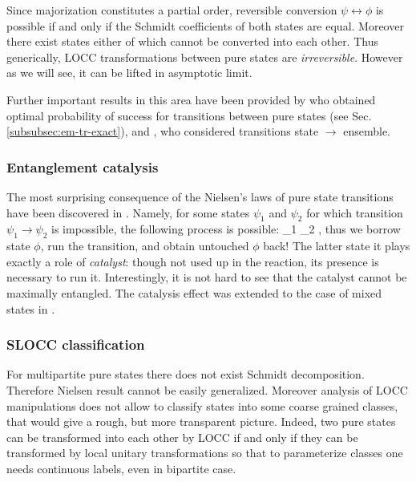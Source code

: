 \documentclass[rmp,12pt,preprint]{revtex4-2}
\begin{document}
Since majorization constitutes a partial order, reversible conversion
$\psi\leftrightarrow\phi$ is possible if and only if the Schmidt
coefficients of both states are equal. Moreover there exist states
either of which cannot be converted into each other. Thus generically,
LOCC transformations between pure states are {\it
  irreversible}. However as we will see, it can be lifted in
asymptotic limit.

Further important results in this area have been provided by
\cite{Vidal} who obtained optimal probability of success for
transitions between pure states (see
Sec. \ref{subsubsec:em-tr-exact}), and \cite{JonathanP}, who
considered transitions state $\to$ ensemble.




\subsubsection{Entanglement catalysis}
\label{subsec:catalysis}
The most surprising consequence of the Nielsen's laws of pure state
transitions have been discovered in \cite{JonathanP}. Namely, for
some states $\psi_1$ and $\psi_2$ for which transition $\psi_1 \to
\psi_2$  is impossible, the following process is possible: \be
\psi_1 \ot \phi \to \psi_2 \ot\phi, \ee thus we borrow state $\phi$,
run the transition, and obtain untouched $\phi$ back! The latter
state it plays exactly a role of {\it catalyst}: though not used up
in the reaction, its presence is necessary to run it.
Interestingly, it is not hard to see that the catalyst  cannot be
maximally entangled. The catalysis effect was extended to the case
of mixed states in \cite{EisertWilkens}.


\subsubsection{SLOCC classification}
\label{subsubsec:slocc}
For multipartite pure states there does not exist Schmidt
decomposition. Therefore Nielsen result cannot be easily
generalized. Moreover analysis of LOCC manipulations does not allow
to classify states into some coarse grained classes, that would give
a rough, but more transparent picture. Indeed, two pure states can
be transformed into each other by LOCC if and only if they can be
transformed by local unitary transformations so that to parameterize
classes one needs continuous labels, even in bipartite case.
\end{document}

